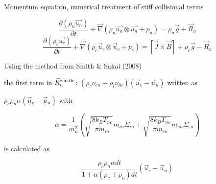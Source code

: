 \documentclass{beamer}
\begin{document}
\begin{frame} {Momentum equation, numerical treatment of stiff collisional terms}

\begin{equation}\nonumber
\frac{\partial (\rho_n\vec{u_n})}{\partial t} + \vec{\nabla}(\rho_n\vec{u_n} \otimes \vec{u_n}+p_n)= \rho_n\vec{g} +\vec{R}_n
\end{equation}
%
\begin{equation} \nonumber
\frac{\partial (\rho_c\vec{u_c})}{\partial t} + \vec{\nabla}(\rho_c\vec{u}_c\otimes\vec{u}_c+p_{c})=[\vec{J}\times\vec{B}] + \rho_c\vec{g}  -\vec{R}_n
\end{equation}

Using the method from Smith \& Sakai (2008)

the first term in $\vec{R}_n^{\rm elastic}$: $(\rho_e\nu_{en} + \rho_i\nu_{in})(\vec{u}_c - \vec{u}_n)$ written as  

$\rho_c \rho_n \alpha (\vec{u}_c - \vec{u}_n)  $ with
 
\begin{equation} \nonumber
\alpha = \frac{1}{m_n^2} \left (\sqrt{\frac{8 k_B T_{nc}}{\pi m_{in}}} m_{in} \Sigma_{in} +  \sqrt{\frac{8 k_B T_{nc}}{\pi m_{en}}} m_{en} \Sigma_{en} \right ) 
\end{equation}

is calculated as 

\begin{equation} \nonumber
\frac{\rho_c \rho_n \alpha dt}{1 + \alpha(\rho_c + \rho_n) dt }(\vec{u}_c - \vec{u}_n)
\end{equation}

\end{frame}

\end{document}
